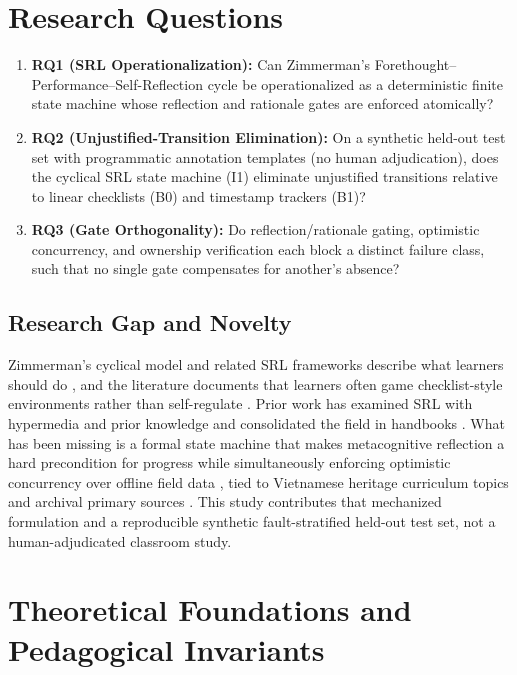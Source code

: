 \documentclass[11pt,a4paper]{article}
\begin{document}
\section{Research Questions}

\begin{enumerate}[label=\textbf{RQ\arabic*}, leftmargin=2.4em]
    \item \textbf{RQ1 (SRL Operationalization):} Can Zimmerman's Forethought--Performance--Self-Reflection cycle be operationalized as a deterministic finite state machine whose reflection and rationale gates are enforced atomically?
    \item \textbf{RQ2 (Unjustified-Transition Elimination):} On a synthetic held-out test set with programmatic annotation templates (no human adjudication), does the cyclical SRL state machine (I1) eliminate unjustified transitions relative to linear checklists (B0) and timestamp trackers (B1)?
    \item \textbf{RQ3 (Gate Orthogonality):} Do reflection/rationale gating, optimistic concurrency, and ownership verification each block a distinct failure class, such that no single gate compensates for another's absence?
\end{enumerate}

\subsection{Research Gap and Novelty}

Zimmerman's cyclical model and related SRL frameworks describe what learners should do \cite{zimmerman2000attaining, zimmerman2002becoming, pintrich2004conceptual}, and the literature documents that learners often game checklist-style environments rather than self-regulate \cite{baker2008gaming, azevedo2005scaffolding}. Prior work has examined SRL with hypermedia and prior knowledge \cite{moos2008self} and consolidated the field in handbooks \cite{schunk2018handbook, winne1998studying}. What has been missing is a formal state machine that makes metacognitive reflection a hard precondition for progress while simultaneously enforcing optimistic concurrency over offline field data \cite{lamport1978time}, tied to Vietnamese heritage curriculum topics \cite{moet2018curriculum} and archival primary sources \cite{phan1837dainam, khamdinh1851hoidien}. This study contributes that mechanized formulation and a reproducible synthetic fault-stratified held-out test set, not a human-adjudicated classroom study.

\section{Theoretical Foundations and Pedagogical Invariants}
\end{document}
